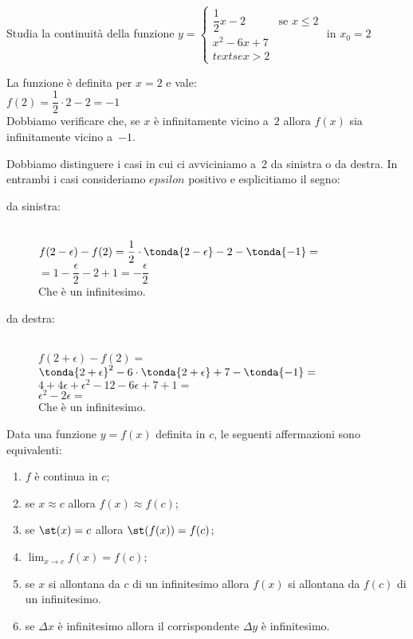 \begin{esempio}
Studia la continuità della funzione 
\(y=\begin{cases} 
    \dfrac{1}{2}x-2 & \text{se }x \leqslant 2 \\ 
    x^2-6x+7 & \\text{se }x > 2
  \end{cases}\)
\quad in \(x_0=2\)

La funzione è definita per \(x=2\) e vale:\\
\(f(2) = \dfrac{1}{2} \cdot 2-2 = -1\)\\
Dobbiamo  verificare che, se \(x\) è infinitamente vicino a~\(2\) allora 
\(f(x)\) sia infinitamente vicino a~\(-1\).

\begin{minipage}{.49\textwidth}
Dobbiamo distinguere i casi in cui ci avviciniamo a~2 da sinistra o da 
destra. In entrambi i casi consideriamo \(epsilon\) positivo e esplicitiamo 
il segno:
\begin{description}
 \item [da sinistra:]
 ~\\
\(f(2-\epsilon) - f(2) =
  \dfrac{1}{2} \cdot \tonda{2-\epsilon}-2-\tonda{-1} =\)\\
\(= 1 - \dfrac{\epsilon}{2} -2 +1 = -\dfrac{\epsilon}{2}\)\\
Che è un infinitesimo.
 \item [da destra:]
 ~\\
\(f(2+\epsilon) - f(2) =\)\\
\(\tonda{2+\epsilon}^2-6 \cdot \tonda{2+\epsilon}+7-\tonda{-1} =\)\\
\(4+4\epsilon+\epsilon^2-12-6 \epsilon+7+1 =\)\\
\(\epsilon^2-2 \epsilon =\)\\
Che è un infinitesimo.
\end{description}
\end{minipage}
\begin{minipage}{.49\textwidth}
\begin{center}\continuitagraficoa\end{center}
\end{minipage}

\end{esempio}

Data una funzione \(y=f(x)\) definita in \(c\), le seguenti 
affermazioni sono equivalenti:

\begin{enumerate}[noitemsep]
 \item \(f\) è continua in \(c\);
 \item se \(x \approx c\) allora \(f(x) \approx f(c)\);
 \item se \(\st(x) = c\) allora \(\st(f(x)) = f(c)\);
 \item \(\lim_{x \to c} f(x) = f(c)\);
 \item se \(x\) si allontana da \(c\) di un infinitesimo allora 
   \(f(x)\) si allontana da \(f(c)\) di un infinitesimo.
 \item se \(\Delta x\) è infinitesimo allora il corrispondente \(\Delta y\) 
   è infinitesimo.
\end{enumerate}

